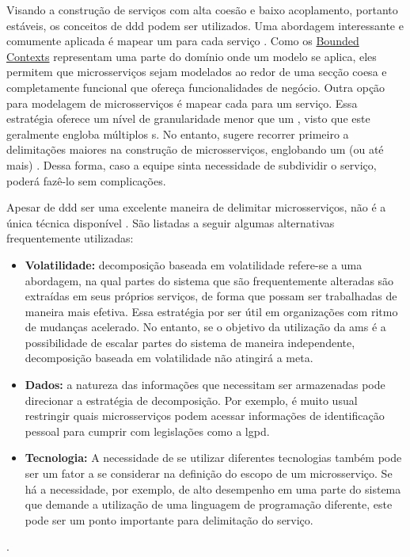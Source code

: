 Visando a construção de serviços com alta coesão e baixo acoplamento, portanto estáveis, os conceitos de \acrshort{ddd} podem ser utilizados. Uma abordagem interessante e comumente aplicada é mapear um  para cada serviço \cite{buildingMicroservices}. Como os \hyperref[section:bounded_context]{Bounded Contexts} representam uma parte do domínio onde um modelo se aplica, eles permitem que microsserviços sejam modelados ao redor de uma secção coesa e completamente funcional que ofereça funcionalidades de negócio. Outra opção para modelagem de microsserviços é mapear cada  para um serviço. Essa estratégia oferece um nível de granularidade menor que um , visto que este geralmente engloba múltiplos s. No entanto,  sugere recorrer primeiro a delimitações maiores na construção de microsserviços, englobando um (ou até mais) . Dessa forma, caso a equipe sinta necessidade de subdividir o serviço, poderá fazê-lo sem complicações.

Apesar de \acrfull{ddd} ser uma excelente maneira de delimitar microsserviços, não é a única técnica disponível \cite{buildingMicroservices}. São listadas a seguir algumas alternativas frequentemente utilizadas:
\begin{itemize}
    \item \textbf{Volatilidade:} decomposição baseada em volatilidade refere-se a uma abordagem, na qual partes do sistema que são frequentemente alteradas são extraídas em seus próprios serviços, de forma que possam ser trabalhadas de maneira mais efetiva. Essa estratégia por ser útil em organizações com ritmo de mudanças acelerado. No entanto, se o objetivo da utilização da \acrshort{ams} é a possibilidade de escalar partes do sistema de maneira independente, decomposição baseada em volatilidade não atingirá a meta.
    \item \textbf{Dados:} a natureza das informações que necessitam ser armazenadas pode direcionar a estratégia de decomposição. Por exemplo, é muito usual restringir quais microsserviços podem acessar informações de identificação pessoal para cumprir com legislações como a \acrfull{lgpd}.
    \item \textbf{Tecnologia:} A necessidade de se utilizar diferentes tecnologias também pode ser um fator a se considerar na definição do escopo de um microsserviço. Se há a necessidade, por exemplo, de alto desempenho em uma parte do sistema que demande a utilização de uma linguagem de programação diferente, este pode ser um ponto importante para delimitação do serviço.
\end{itemize}
\cite{buildingMicroservices}.

